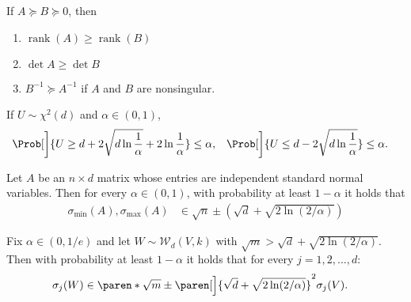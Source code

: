 \documentclass{article}
\newcommand{\inv}[1]{#1^{-1}}
\newcommand{\rank}{\operatorname{rank}}
\renewcommand{\det}{\operatorname{det}}
\DeclarePairedDelimiter{\paren}()
\newcommand{\Wishart}{\mathcal{W}}
\begin{document}
\begin{claim}%
  \label{claim:psd-matrix-props}%
  If $A \succeq B \succeq 0$, then
  \begin{enumerate}[nolistsep]
  \item $\rank(A) \ge \rank(B)$
  \item $\det A \ge \det B$
  \item $\inv{B} \succeq \inv{A}$ if $A$ and $B$ are nonsingular.
  \end{enumerate}
\end{claim}

\begin{claim}%
  \label{claim:chi2-tails}
  If $U\sim\chi^2(d)$ and $\alpha\in(0,1)$,
  \begin{align*}
    \Prob[\bigg]{U \ge d + 2\sqrt{d\ln\frac{1}{\alpha}} + 2\ln\frac{1}{\alpha}} &\le \alpha,
    & \Prob[\bigg]{U \le d - 2\sqrt{d\ln\frac{1}{\alpha}}} &\le \alpha.
  \end{align*}
\end{claim}

\begin{claim}%
  \label{claim:gaussian-matrix-tails}
  Let $A$ be an $n\times d$ matrix whose entries are independent
  standard normal variables.  Then for every $\alpha\in(0,1)$, with
  probability at least $1-\alpha$ it holds that
  \begin{align*}
    \sigma_{\min}(A), \sigma_{\max}(A) &\in \sqrt{n} \pm (\sqrt{d} + \sqrt{2\ln(2/\alpha)})
  \end{align*}
\end{claim}

\begin{claim}%
  \label{claim:wishart-tails}
  Fix $\alpha\in(0,1/e)$ and let $W\sim\Wishart_d(V, k)$ with $\sqrt{m}
  > \sqrt{d} + \sqrt{2\ln(2/\alpha)}$.  Then with probability at least
  $1-\alpha$ it holds that for every $j = 1,2,\dotsc,d$:
  \begin{align*}
    \sigma_j(W) &\in \paren*{\sqrt{m} \pm \paren[\Big]{\sqrt{d} + \sqrt{2\ln(2/\alpha)}}}^2 \sigma_j(V).
  \end{align*}
\end{claim}

\end{document}
